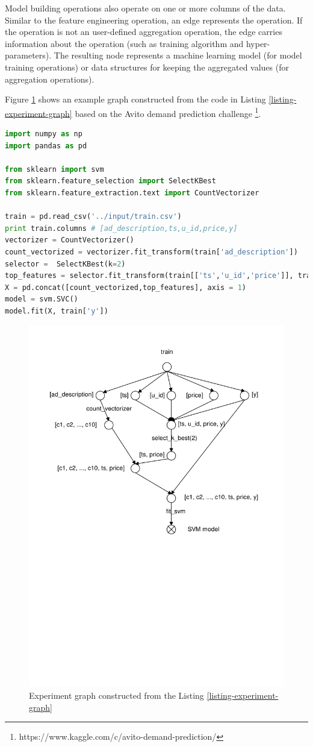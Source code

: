 Model building operations also operate on one or more columns of the data.
Similar to the feature engineering operation, an edge represents the operation.
If the operation is not an user-defined aggregation operation, the edge carries information about the operation (such as training algorithm and hyper-parameters).
The resulting node represents a machine learning model (for model training operations) or data structures for keeping the aggregated values (for aggregation operations).

Figure \ref{fig-experiment-graph} shows an example graph constructed from the code in Listing \ref{listing-experiment-graph} based on the Avito demand prediction challenge \footnote{https://www.kaggle.com/c/avito-demand-prediction/}.

\begin{lstlisting}[language=Python, caption=Example script,captionpos=b,label = {listing-experiment-graph}]
import numpy as np
import pandas as pd

from sklearn import svm
from sklearn.feature_selection import SelectKBest
from sklearn.feature_extraction.text import CountVectorizer

train = pd.read_csv('../input/train.csv') 
print train.columns # [ad_description,ts,u_id,price,y]
vectorizer = CountVectorizer()
count_vectorized = vectorizer.fit_transform(train['ad_description'])
selector =  SelectKBest(k=2)
top_features = selector.fit_transform(train[['ts','u_id','price']], train['y'])
X = pd.concat([count_vectorized,top_features], axis = 1)
model = svm.SVC()
model.fit(X, train['y'])
\end{lstlisting}

\begin{figure}
\centering
\includegraphics[width=\columnwidth]{../images/experiment-graph}
\caption{Experiment graph constructed from the Listing \ref{listing-experiment-graph}}
\label{fig-experiment-graph}
\end{figure}

